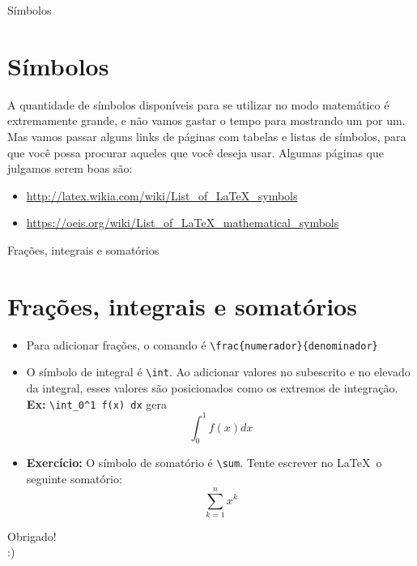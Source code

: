 \documentclass[12pt]{beamer}
\begin{document}
\begin{frame}{Símbolos}
  \section{Símbolos}

  A quantidade de símbolos disponíveis para se utilizar no modo matemático é extremamente grande, e não vamos gastar o tempo para mostrando um por um. Mas vamos passar alguns links de páginas com tabelas e listas de símbolos, para que você possa procurar aqueles que você deseja usar. Algumas páginas que julgamos serem boas são:

  \begin{itemize}
    \item \url{http://latex.wikia.com/wiki/List_of_LaTeX_symbols}
    \item \url{https://oeis.org/wiki/List_of_LaTeX_mathematical_symbols}
  \end{itemize}
\end{frame}

\begin{frame}[fragile]{Frações, integrais e somatórios}
  \section{Frações, integrais e somatórios}
  \begin{itemize}
    \item Para adicionar frações, o comando é \verb+\frac{numerador}{denominador}+
    \item O símbolo de integral é \verb+\int+. Ao adicionar valores no subescrito e no elevado da integral, esses valores são posicionados como os extremos de integração. \textbf{Ex:} \verb+\int_0^1 f(x) dx+ gera
    \[
    \int_{0}^1 f(x) dx
    \]
    \item \textbf{Exercício:} O símbolo de somatório é \verb+\sum+. Tente escrever no \LaTeX\ o seguinte somatório:
    \[
      \sum_{k=1}^n x^k
    \]
  \end{itemize}
\end{frame}

\begin{frame}
  \begin{center}
    \large Obrigado!\\
    :)
  \end{center}
\end{frame}
\end{document}
